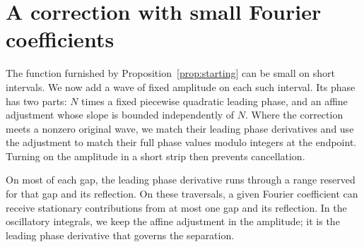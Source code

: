 \section{A correction with small Fourier coefficients}
\label{sec:correction}

The function furnished by Proposition~\ref{prop:starting} can be small on
short intervals.  We now add a wave of fixed amplitude on each such interval.
Its phase has two parts: $N$ times a fixed piecewise quadratic leading
phase, and an affine adjustment whose slope is bounded independently
of $N$. Where the correction meets a nonzero original wave, we match
their leading phase derivatives and use the adjustment to match their
full phase values modulo integers at the endpoint. Turning on the amplitude in a short
strip then prevents cancellation.

On most of each gap, the leading phase derivative runs through a range
reserved for that gap and its reflection. On these traversals, a given
Fourier coefficient can receive stationary contributions from at most
one gap and its reflection. In the oscillatory integrals, we keep the affine adjustment
in the amplitude; it is the leading phase derivative that governs the
separation.

